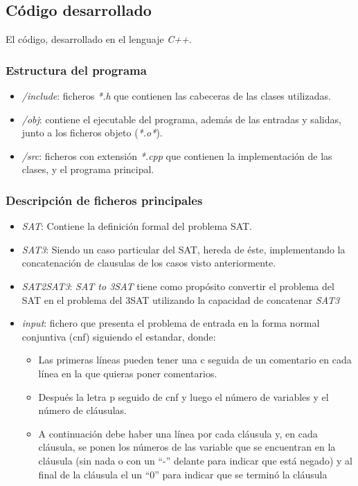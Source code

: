 \documentclass{article}
\begin{document}
\subsection{Código desarrollado}
El código, desarrollado en el lenguaje \textit{C++}.
\subsubsection{Estructura del programa}
\begin{itemize}
    \item \textit{/include}: ficheros \textit{*.h} que contienen las cabeceras de las clases utilizadas.
    \item \textit{/obj}: contiene el ejecutable del programa, además de las entradas y salidas, junto a los ficheros objeto (\textit{*.o*}).
    \item \textit{/src}: ficheros con extensión \textit{*.cpp} que contienen la implementación de las clases, y el programa principal.
\end{itemize}

\subsubsection{Descripción de ficheros principales}
\begin{itemize}
    \item \textit{SAT}: Contiene la definición formal del problema SAT.
    \item \textit{SAT3}: Siendo un caso particular del SAT, hereda de éste, implementando la concatenación de clausulas de los casos visto anteriormente.
    \item \textit{SAT2SAT3}: \textit{SAT to 3SAT} tiene como propósito convertir el problema del SAT en el problema del 3SAT utilizando la capacidad de concatenar \de \textit{SAT3}
    \item \textit{input}: fichero que presenta el problema de entrada en la forma normal conjuntiva (cnf) siguiendo el estandar, donde:
    \begin {itemize}
        \item Las primeras líneas pueden tener una c seguida de un comentario en cada línea en la que quieras poner comentarios.
        \item Después la letra p seguido de cnf y luego el número de variables y el número de cláusulas.
        \item A continuación debe haber una línea por cada cláusula y, en cada cláusula, se ponen los números de las variable que se encuentran en la cláusula (sin nada o con un “-” delante para indicar que está negado) y al final de la cláusula el un “0” para indicar que se terminó la cláusula
    \end{itemize}
\end{itemize}
\end{document}
